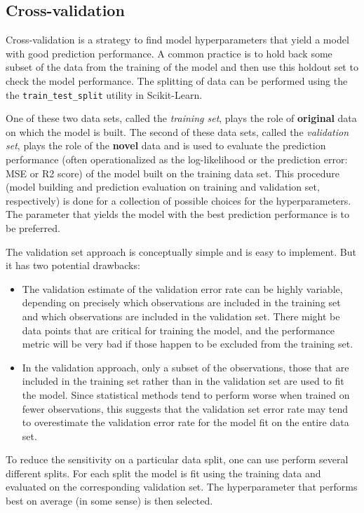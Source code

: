 \documentclass[%
oneside,                 %
final,                   %
10pt]{article}
\begin{document}
\subsection{Cross-validation}

Cross-validation is a strategy to find model hyperparameters that yield a model with good prediction
performance. A common practice is to hold back some subset of the data from the training of the model and then use this holdout set to check the model performance. The splitting of data can be performed using the the \Verb!train_test_split! utility in Scikit-Learn.

One of these two data sets, called the 
\emph{training set}, plays the role of \textbf{original} data on which the model is
built. The second of these data sets, called the \emph{validation set}, plays the
role of the \textbf{novel} data and is used to evaluate the prediction
performance (often operationalized as the log-likelihood or the
prediction error: MSE or R2 score) of the model built on the training data set. This
procedure (model building and prediction evaluation on training and
validation set, respectively) is done for a collection of possible choices for the hyperparameters. The parameter that yields the model with
the best prediction performance is to be preferred. 

The validation set approach is conceptually simple and is easy to implement. But it has two potential drawbacks:

\begin{itemize}
\item The validation estimate of the validation error rate can be highly variable, depending on precisely which observations are included in the training set and which observations are included in the validation set. There might be data points that are critical for training the model, and the performance metric will be very bad if those happen to be excluded from the training set.

\item In the validation approach, only a subset of the observations, those that are included in the training set rather than in the validation set are used to fit the model. Since statistical methods tend to perform worse when trained on fewer observations, this suggests that the validation set error rate may tend to overestimate the validation error rate for the model fit on the entire data set.
\end{itemize}

\noindent
To reduce the sensitivity on a particular data split, one can use perform several different splits. For each split the model is fit using the training data and
evaluated on the corresponding validation set. The hyperparameter that performs best on average (in some sense) is then selected.
\end{document}
